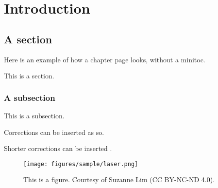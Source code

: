 \chapter{Introduction}
\label{ch: Introduction}



\section{A section}
Here is an example of how a chapter page looks, without a minitoc. 

\noindent This is a section.

\subsection{A subsection}
This is a subsection.

\begin{mccorrection}
Corrections can be inserted as so. 
\end{mccorrection}

Shorter corrections can be inserted . 

\begin{figure}[!ht]
    \centering
    \texttt{[image: figures/sample/laser.png]}
    \caption{This is a figure. Courtesy of Suzanne Lim (CC BY-NC-ND 4.0).}
    \label{fig:laser}
\end{figure}